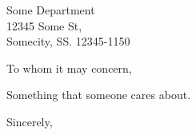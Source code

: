 \documentclass{letter}
\begin{document}
\begin{letter}{Some Department\\
12345 Some St,\\
Somecity, SS. 12345-1150}

\opening{To whom it may concern,}

Something that someone cares about.

\closing{Sincerely,}

\end{letter}
\end{document}
